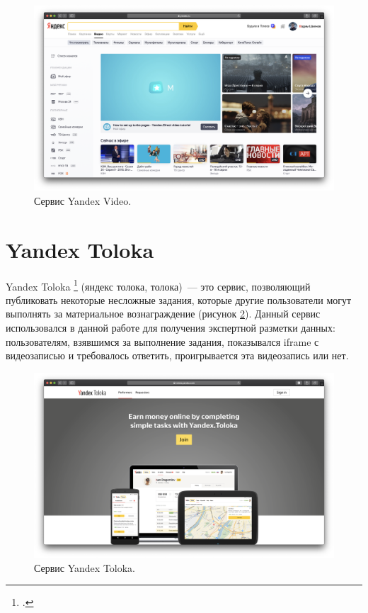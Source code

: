 \begin{figure}
    \centering
    \includegraphics[width=\textwidth]{../images/yandex_video.png}
    \caption{Сервис Yandex Video.}
    \label{fig:yandex_video}
\end{figure}

\section{Yandex Toloka}

Yandex Toloka \footcite{Toloka} (яндекс толока, толока)~--- это сервис, позволяющий публиковать некоторые несложные задания, которые другие пользователи могут выполнять за материальное вознаграждение (рисунок \ref{fig:yandex_toloka}). Данный сервис использовался в данной работе для получения экспертной разметки данных: пользователям, взявшимся за выполнение задания, показывался iframe с видеозаписью и требовалось ответить, проигрывается эта видеозапись или нет.

\begin{figure}
    \centering
    \includegraphics[width=\textwidth]{../images/yandex_toloka.png}
    \caption{Сервис Yandex Toloka.}
    \label{fig:yandex_toloka}
\end{figure}